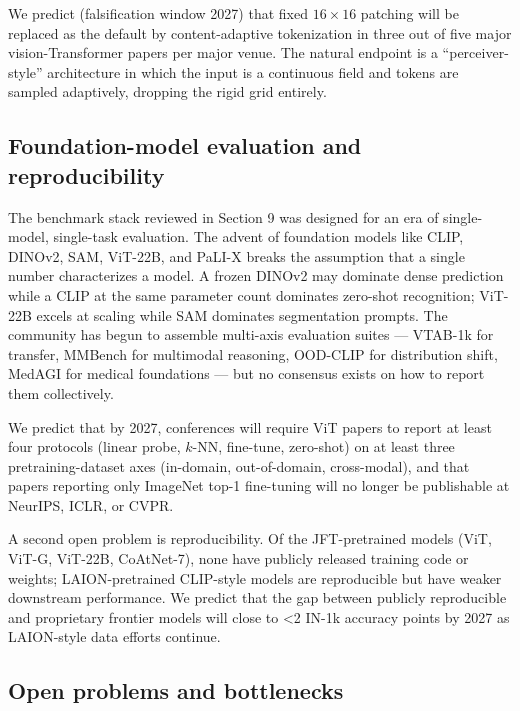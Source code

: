 \documentclass{article}
\begin{document}
We predict (falsification window 2027) that fixed \(16 \times 16\) patching will be replaced as the default by content-adaptive tokenization in three out of five major vision-Transformer papers per major venue. The natural endpoint is a ``perceiver-style'' architecture in which the input is a continuous field and tokens are sampled adaptively, dropping the rigid grid entirely.

\subsection{Foundation-model evaluation and reproducibility}\label{foundation-model-evaluation-and-reproducibility}

The benchmark stack reviewed in Section 9 was designed for an era of single-model, single-task evaluation. The advent of foundation models like CLIP, DINOv2, SAM, ViT-22B, and PaLI-X breaks the assumption that a single number characterizes a model. A frozen DINOv2 may dominate dense prediction while a CLIP at the same parameter count dominates zero-shot recognition; ViT-22B excels at scaling while SAM dominates segmentation prompts. The community has begun to assemble multi-axis evaluation suites --- VTAB-1k for transfer, MMBench for multimodal reasoning, OOD-CLIP for distribution shift, MedAGI for medical foundations --- but no consensus exists on how to report them collectively.

We predict that by 2027, conferences will require ViT papers to report at least four protocols (linear probe, \(k\)-NN, fine-tune, zero-shot) on at least three pretraining-dataset axes (in-domain, out-of-domain, cross-modal), and that papers reporting only ImageNet top-1 fine-tuning will no longer be publishable at NeurIPS, ICLR, or CVPR.

A second open problem is reproducibility. Of the JFT-pretrained models (ViT, ViT-G, ViT-22B, CoAtNet-7), none have publicly released training code or weights; LAION-pretrained CLIP-style models are reproducible but have weaker downstream performance. We predict that the gap between publicly reproducible and proprietary frontier models will close to \textless2 IN-1k accuracy points by 2027 as LAION-style data efforts continue.

\subsection{Open problems and bottlenecks}\label{open-problems-and-bottlenecks}
\end{document}
